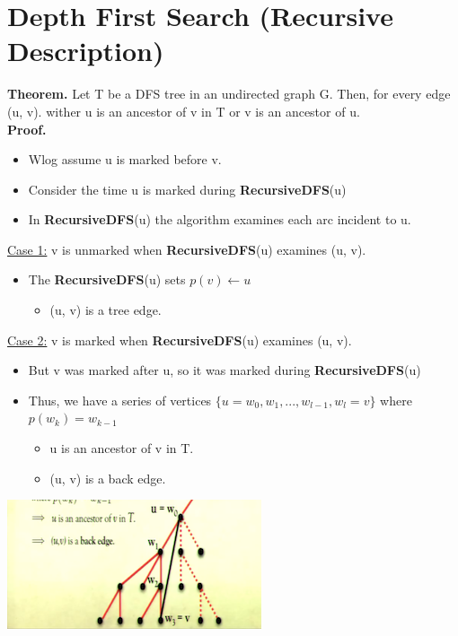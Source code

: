 \documentclass[12pt]{article}
\begin{document}
\section{Depth First Search (Recursive Description)}
\renewcommand{\labelitemii}{$\circ$}
\renewcommand{\labelitemiii}{$\cdot$}
\renewcommand{\labelitemiii}{$\rightarrow$}
\renewcommand{\labelitemiv}{$\star$}
 \textbf{Theorem.} Let T be a DFS tree in an undirected graph G. Then, for every edge (u, v). wither u is an ancestor of v in T or v is an ancestor of u.\\
 \textbf{Proof.}
	\begin{itemize}
	\item Wlog assume u is marked before v.
	\item Consider the time u is marked during \textbf{RecursiveDFS}(u)
	\item In \textbf{RecursiveDFS}(u) the algorithm examines each arc incident to u.
	\end{itemize}
\underline{Case 1:} v is unmarked when \textbf{RecursiveDFS}(u) examines (u, v).
	\begin{itemize}
	\item The \textbf{RecursiveDFS}(u) sets $p(v) \leftarrow u$
		\begin{itemize}
		\item (u, v) is a tree edge.	
		\end{itemize}
	\end{itemize}
\underline{Case 2:} v is marked when \textbf{RecursiveDFS}(u) examines (u, v).
	\begin{itemize}
	\item But v was marked after u, so it was marked during \textbf{RecursiveDFS}(u)
	\item Thus, we have a series of vertices $\{u=w_0, w_1, ... , w_{l - 1}, w_l = v \}$ where $p(w_k) = w_{k - 1}$
		\begin{itemize}
		\item u is an ancestor of v in T.
		\item (u, v) is a back edge.
		\end{itemize}
	\end{itemize}
\begin{center}
\includegraphics{lecture94}
\end{center}
\end{document}
